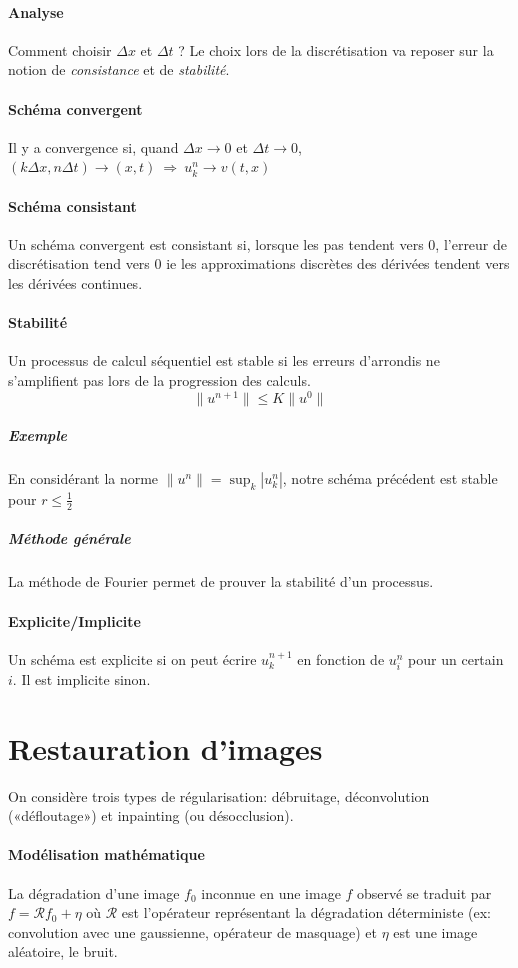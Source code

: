 \documentclass[french]{article}
\begin{document}
\paragraph{Analyse} Comment choisir $\Delta x$ et $\Delta t$ ? Le choix
lors de la discrétisation va reposer sur la notion de \emph{consistance}
et de \emph{stabilité}.

\paragraph{Schéma convergent} Il y a convergence si, quand $\Delta x \to 0$
et $\Delta t \to 0$, $(k\Delta x, n\Delta t) \to (x,t)\ \Rightarrow\ u_k^n \to v(t,x)$

\paragraph{Schéma consistant} Un schéma convergent est consistant si,
lorsque les pas tendent vers $0$, l'erreur de discrétisation tend vers $0$ ie
les approximations discrètes des dérivées tendent vers les dérivées continues.

\paragraph{Stabilité}Un processus de calcul séquentiel est stable si les
erreurs d'arrondis ne s'amplifient pas lors de la progression des calculs.
$$\|u^{n+1} \| \le K\|u^0\|$$

\subparagraph{Exemple} En considérant la norme $\|u^n\| = \sup_k{|u_k^n|}$,
notre schéma précédent est stable pour $r \le \frac{1}{2}$

\subparagraph{Méthode générale}La méthode de Fourier permet de prouver
la stabilité d'un processus.

\paragraph{Explicite/Implicite} Un schéma est explicite si on peut écrire
$u_k^{n+1}$ en fonction de $u_i^n$ pour un certain $i$. Il est implicite
sinon.

\section{Restauration d'images}
On considère trois types de régularisation: débruitage, déconvolution
(«défloutage») et inpainting (ou désocclusion).

\paragraph{Modélisation mathématique} La dégradation d'une image $f_0$
inconnue en une image $f$ observé se traduit par $f = \mathcal{R} f_0 + \eta$
où $\mathcal{R}$ est l'opérateur représentant la dégradation déterministe
(ex: convolution avec une gaussienne, opérateur de masquage) et $\eta$ est
une image aléatoire, le bruit.
\end{document}
